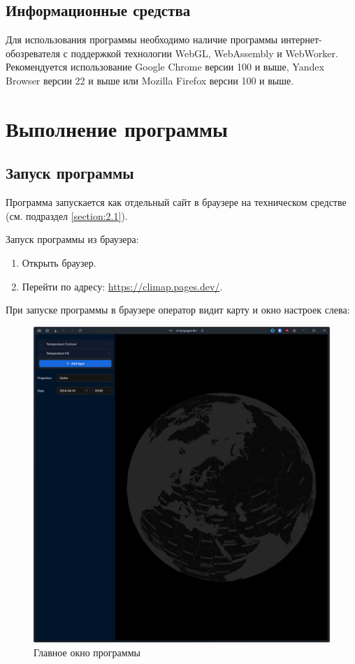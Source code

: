 \documentclass[a4paper, 12pt]{article}
\begin{document}
	\subsection{Информационные средства}\label{section:2.2}
	Для использования программы необходимо наличие программы интернет-обозревателя с поддержкой технологии WebGL,
	WebAssembly и WebWorker. Рекомендуется использование Google Chrome версии 100 и выше, Yandex Browser версии 22 и выше
	или Mozilla Firefox версии 100 и выше.

	\section{Выполнение программы}
	\subsection{Запуск программы}
	Программа запускается как отдельный сайт в браузере на техническом средстве (см. подраздел \ref{section:2.1}).

	Запуск программы из браузера:
	\begin{enumerate}
		\item Открыть браузер.

		\item Перейти по адресу: \href{https://climap.pages.dev/}{https://climap.pages.dev/}.
	\end{enumerate}

	При запуске программы в браузере оператор видит карту и окно настроек слева:
	\begin{figure}[!h]
		\centering
		\includegraphics[width=15cm]{./assets/pic1.png}
		\caption{Главное окно программы}
	\end{figure}
\end{document}
